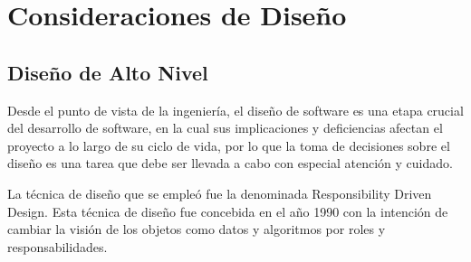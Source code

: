 \chapter{Consideraciones de Dise\~no}
	\section{Dise\~no de Alto Nivel}
        Desde el punto de vista de la ingenier\'ia, el dise\~no de software es una etapa crucial del desarrollo de software, en la cual sus implicaciones y 
		deficiencias afectan el proyecto a lo largo de su ciclo de vida\cite{pressman}, por lo que la toma de decisiones sobre el dise\~no es una tarea que debe 
		ser llevada a cabo con especial atenci\'on y cuidado.

		La t\'ecnica de dise\~no que se emple\'o fue la denominada Responsibility Driven Design\cite{responsibility}. Esta t\'ecnica de dise\~no fue concebida en 
		el a\~no 1990 con la intenci\'on de cambiar la visi\'on de los objetos como datos y algoritmos por roles y responsabilidades.
		
